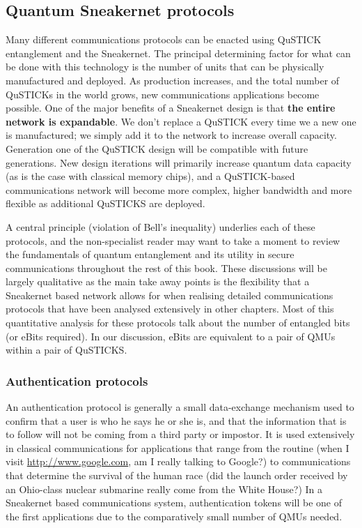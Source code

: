 \documentclass[twocolumn, aps, rmp, amsmath, amssymb, nofootinbib, superscriptaddress, longbibliography, floatfix, table-of-contents, eqsecnum]{revtex4-2}
\begin{document}
\subsection{Quantum Sneakernet protocols}

Many different communications protocols can be enacted using QuSTICK entanglement and the Sneakernet. The principal determining factor for what can be done with this technology is the number of units that can be physically manufactured and deployed. As production increases, and the total number of QuSTICKs in the world grows, new communications applications become possible. One of the major benefits of a Sneakernet design is that \textbf{the entire network is expandable}. We don't replace a QuSTICK every time we a new one is manufactured; we simply add it to the network to increase overall capacity. Generation one of the QuSTICK design will be compatible with future generations. New design iterations will primarily increase quantum data capacity (as is the case with classical memory chips), and a QuSTICK-based communications network will become more complex, higher bandwidth and more flexible as additional QuSTICKS are deployed. 

A central principle (violation of Bell's inequality) underlies each of these protocols, and the non-specialist reader may want to take a moment to review the fundamentals of quantum entanglement and its utility in secure communications throughout the rest of this book. These discussions will be largely qualitative as the main take away points is the flexibility that a Sneakernet based network allows for when realising detailed communications protocols that have been analysed extensively in other chapters. Most of this quantitative analysis for these protocols talk about the number of entangled bits (or eBits required). In our discussion, eBits are equivalent to a pair of QMUs within a pair of QuSTICKS. 

\subsubsection{Authentication protocols}

An authentication protocol is generally a small data-exchange mechanism used to confirm that a user is who he says he or she is, and that the information that is to follow will not be coming from a third party or impostor. It is used extensively in classical communications for applications that range from the routine (when I visit \href{href://www.google.com}{http://www.google.com}, am I really talking to Google?) to communications that determine the survival of the human race (did the launch order received by an Ohio-class nuclear submarine really come from the White House?) In a Sneakernet based communications system, authentication tokens will be one of the first applications due to the comparatively small number of QMUs needed. 
\end{document}
